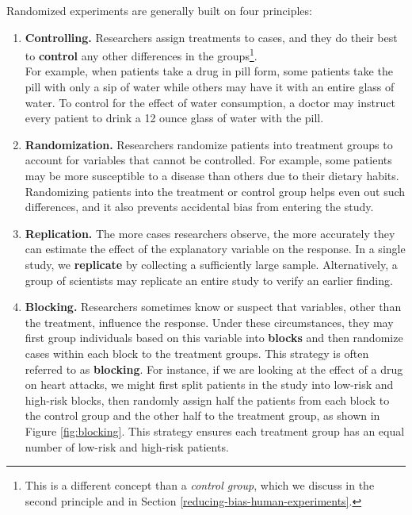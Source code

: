 \documentclass[
  10pt,
  openany]{book}
\theoremstyle{definition}
\theoremstyle{definition}
\theoremstyle{definition}
\theoremstyle{definition}
\theoremstyle{remark}
\begin{document}
Randomized experiments are generally built on four principles:

\begin{enumerate}
\def\labelenumi{\arabic{enumi}.}
\item
  \textbf{Controlling.} Researchers assign treatments to cases, and they do their best to \textbf{control} any other differences in the groups\footnote{This is a different concept than a \emph{control group}, which we discuss in the second principle and in Section \ref{reducing-bias-human-experiments}.}.\\
  For example, when patients take a drug in pill form, some patients take the pill with only a sip of water while others may have it with an entire glass of water.
  To control for the effect of water consumption, a doctor may instruct every patient to drink a 12 ounce glass of water with the pill.
\item
  \textbf{Randomization.} Researchers randomize patients into treatment groups to account for variables that cannot be controlled.
  For example, some patients may be more susceptible to a disease than others due to their dietary habits.
  Randomizing patients into the treatment or control group helps even out such differences, and it also prevents accidental bias from entering the study.
\item
  \textbf{Replication.} The more cases researchers observe, the more accurately they can estimate the effect of the explanatory variable on the response.
  In a single study, we \textbf{replicate} by collecting a sufficiently large sample.
  Alternatively, a group of scientists may replicate an entire study to verify an earlier finding.
\item
  \textbf{Blocking.} Researchers sometimes know or suspect that variables, other than the treatment, influence the response.
  Under these circumstances, they may first group individuals based on this variable into \textbf{blocks} and then randomize cases within each block to the treatment groups.
  This strategy is often referred to as \textbf{blocking}.
  For instance, if we are looking at the effect of a drug on heart attacks, we might first split patients in the study into low-risk and high-risk blocks, then randomly assign half the patients from each block to the control group and the other half to the treatment group, as shown in Figure \ref{fig:blocking}.
  This strategy ensures each treatment group has an equal number of low-risk and high-risk patients.
\end{enumerate}
\end{document}
